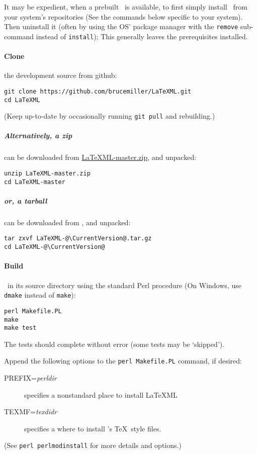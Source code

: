 \documentclass{article}
\begin{document}
It may be expedient, when a prebuilt \LaTeXML\ is available,
to first simply install \LaTeXML\ from your system's repositories
(See the commands below specific to your system).
Then uninstall it 
(often by using the OS' package manager with the \texttt{remove} sub-command
instead of \texttt{install});
This generally leaves the prerequisites installed.

\paragraph*{Clone}
the development source from github:
\begin{lstlisting}[style=shell]
git clone https://github.com/brucemiller/LaTeXML.git
cd LaTeXML
\end{lstlisting}
(Keep up-to-date by occasionally running 
\lstinline[style=shell]{git pull} and rebuilding.)

\subparagraph*{Alternatively, a zip} can be downloaded from
\href{https://github.com/brucemiller/LaTeXML/archive/master.zip}{LaTeXML-master.zip},
and unpacked:
\begin{lstlisting}[style=shell]
unzip LaTeXML-master.zip
cd LaTeXML-master
\end{lstlisting}
\subparagraph{or, a tarball} can be downloaded from \CurrentTarball, and unpacked:
\begin{lstlisting}[style=shell]
tar zxvf LaTeXML-@\CurrentVersion@.tar.gz
cd LaTeXML-@\CurrentVersion@
\end{lstlisting}

\paragraph*{Build}
\LaTeXML\ in its source directory using the standard Perl procedure
(On Windows, use \texttt{dmake} instead of \texttt{make}):
\begin{lstlisting}[style=shell]
perl Makefile.PL
make
make test
\end{lstlisting}
The tests should complete without error (some tests may be `skipped').

Append the following options to the \texttt{perl Makefile.PL} command, if desired:
\begin{description}
\item[PREFIX=\textit{perldir}] specifies a nonstandard place to install LaTeXML
\item[TEXMF=\textit{texdidr}] specifies a where to install \LaTeXML's \TeX\ style files.
\end{description}
(See \texttt{perl perlmodinstall} for more details and options.)
\end{document}
